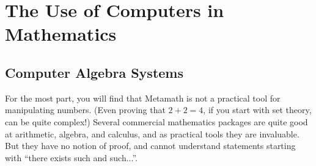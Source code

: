 \section{The Use of Computers in Mathematics}

\subsection{Computer Algebra Systems}

For the most part, you will find that Metamath is not a
practical tool for manipulating numbers.  (Even proving that $2 + 2 = 4$, if
you start with set theory, can be quite complex!)  Several commercial
mathematics packages are quite good at arithmetic, algebra, and calculus, and
as practical tools they are invaluable. But
they have no notion of proof, and cannot understand statements starting with
``there exists such and such...''.

